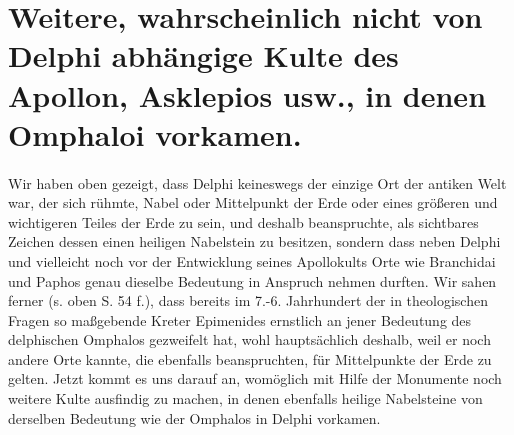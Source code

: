 \documentclass[a4paper, 11pt, oneside]{article}
\begin{document}
\section{Weitere, wahrscheinlich nicht von Delphi abhängige Kulte des Apollon, Asklepios usw., in denen Omphaloi vorkamen.}
\paragraph{}
Wir haben oben gezeigt, dass Delphi keineswegs der einzige Ort der antiken Welt war, der sich rühmte, Nabel oder Mittelpunkt der Erde oder eines größeren und wichtigeren Teiles der Erde zu sein, und deshalb beanspruchte, als sichtbares Zeichen dessen einen heiligen Nabelstein zu besitzen, sondern dass neben Delphi und vielleicht noch vor der Entwicklung seines Apollokults Orte wie Branchidai und Paphos genau dieselbe Bedeutung in Anspruch nehmen durften. Wir sahen ferner (s. oben S. 54 f.), dass bereits im 7.-6. Jahrhundert der in theologischen Fragen so maßgebende Kreter Epimenides ernstlich an jener Bedeutung des delphischen Omphalos gezweifelt hat, wohl hauptsächlich deshalb, weil er noch andere Orte kannte, die ebenfalls beanspruchten, für Mittelpunkte der Erde zu gelten. Jetzt kommt es uns darauf an, womöglich mit Hilfe der Monumente noch weitere Kulte ausfindig zu machen, in denen ebenfalls heilige Nabelsteine von derselben Bedeutung wie der Omphalos in Delphi vorkamen.
\end{document}
